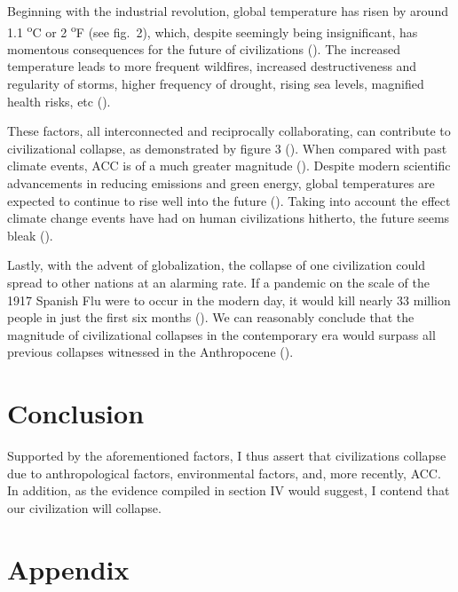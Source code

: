 \documentclass[12pt, a4paper, twoside]{article}
\begin{document}
Beginning with the industrial revolution, global temperature has risen by around 1.1 \textsuperscript{o}C or 2 \textsuperscript{o}F (see fig.\ 2), which, despite seemingly being insignificant, has momentous consequences for the future of civilizations (\cite{lindsey2024globaltemp}). The increased temperature leads to more frequent wildfires, increased destructiveness and regularity of storms, higher frequency of drought, rising sea levels, magnified health risks, etc (\cites[p.\ 1]{diffenbaugh2021wildfire}[p.\ 4]{aumann2008frequency}[pp.\ 14–16]{dai2011drought}[p.\ 1]{meehl2005howmuch}[p.\ 5]{vermeer2009sealevel}{epa2022airquality}). 

These factors, all interconnected and reciprocally collaborating, can contribute to civilizational collapse, as demonstrated by figure 3 (\cite[p.\ 7]{kanter2009warming}). When compared with past climate events, ACC is of a much greater magnitude (\cite{nasa2010globalwarming}). Despite modern scientific advancements in reducing emissions and green energy, global temperatures are expected to continue to rise well into the future (\cite{ucar2021predictions}). Taking into account the effect climate change events have had on human civilizations hitherto, the future seems bleak (\cite[pp.\ 190–191]{natgeo2007visual}).

Lastly, with the advent of globalization, the collapse of one civilization could spread to other nations at an alarming rate. If a pandemic on the scale of the 1917 Spanish Flu were to occur in the modern day, it would kill nearly 33 million people in just the first six months (\cite{gates2018shattuck}). We can reasonably conclude that the magnitude of civilizational collapses in the contemporary era would surpass all previous collapses witnessed in the Anthropocene (\cite{juling2023future}). 

\section{Conclusion}

Supported by the aforementioned factors, I thus assert that civilizations collapse due to anthropological factors, environmental factors, and, more recently, ACC. In addition, as the evidence compiled in section IV would suggest, I contend that our civilization will collapse. 

\newpage

\section{Appendix}
\end{document}
